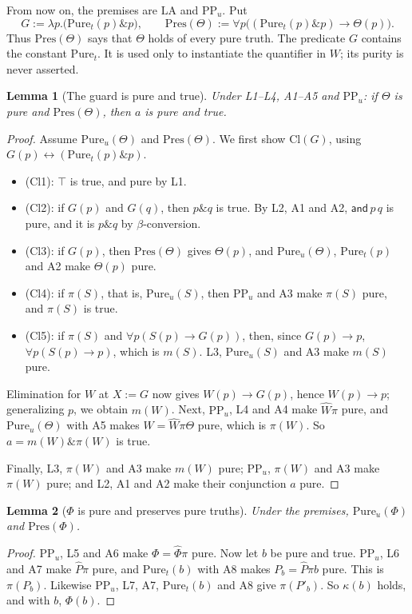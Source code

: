 \documentclass[12pt,leqno]{article}
\newcommand{\AND}{\ensuremath{\mathbin{\&}}}
\newcommand{\IFF}{\ensuremath{\leftrightarrow}}
\newcommand{\IC}{\ensuremath{\rightarrow}}
\newcommand{\Pure}{\ensuremath{\mathrm{Pure}}}
\newcommand{\Cl}{\ensuremath{\mathrm{Cl}}}
\newcommand{\Pres}{\ensuremath{\mathrm{Pres}}}
\newcommand{\PPu}{\ensuremath{\mathrm{PP}_u}}
\newcommand{\hW}{\ensuremath{\widehat{W}}}
\newcommand{\hP}{\ensuremath{\widehat{P}}}
\newcommand{\hPhi}{\ensuremath{\widehat{\Phi}}}
\newcommand{\conj}{\ensuremath{\mathsf{and}}}
\theoremstyle{plain}
\newtheorem{lemma}{Lemma}
\begin{document}
From now on, the premises are \(\mathrm{LA}\) and \(\PPu\). Put
\[
 G:=\lambda p.\bigl(\Pure_t(p)\AND p\bigr),\qquad
 \Pres(\Theta):=\forall p\bigl((\Pure_t(p)\AND p)\IC\Theta(p)\bigr).
\]
Thus \(\Pres(\Theta)\) says that \(\Theta\) holds of every pure truth.
The predicate \(G\) contains the constant \(\Pure_t\). It is used only to
instantiate the quantifier in \(W\); its purity is never asserted.

\begin{lemma}[The guard is pure and true]\label{lem:closure-true}
Under L1--L4, A1--A5 and \(\PPu\): if \(\Theta\) is pure and
\(\Pres(\Theta)\), then \(a\) is pure and true.
\end{lemma}
\begin{proof}
Assume \(\Pure_u(\Theta)\) and \(\Pres(\Theta)\). We first show
\(\Cl(G)\), using \(G(p)\IFF(\Pure_t(p)\AND p)\).
\begin{itemize}
\item (Cl1): \(\top\) is true, and pure by L1.
\item (Cl2): if \(G(p)\) and \(G(q)\), then \(p\AND q\) is true. By L2,
  A1 and A2, \(\conj\,p\,q\) is pure, and it is \(p\AND q\) by
  \(\beta\)-conversion.
\item (Cl3): if \(G(p)\), then \(\Pres(\Theta)\) gives \(\Theta(p)\), and
  \(\Pure_u(\Theta)\), \(\Pure_t(p)\) and A2 make \(\Theta(p)\) pure.
\item (Cl4): if \(\pi(S)\), that is, \(\Pure_u(S)\), then \(\PPu\) and A3
  make \(\pi(S)\) pure, and \(\pi(S)\) is true.
\item (Cl5): if \(\pi(S)\) and \(\forall p(S(p)\IC G(p))\), then, since
  \(G(p)\IC p\), \(\forall p(S(p)\IC p)\), which is \(m(S)\). L3,
  \(\Pure_u(S)\) and A3 make \(m(S)\) pure.
\end{itemize}
Elimination for \(W\) at \(X:=G\) now gives \(W(p)\IC G(p)\), hence
\(W(p)\IC p\); generalizing \(p\), we obtain \(m(W)\). Next, \(\PPu\),
L4 and A4 make \(\hW\pi\) pure, and \(\Pure_u(\Theta)\) with A5 makes
\(W=\hW\pi\Theta\) pure, which is \(\pi(W)\). So
\(a=m(W)\AND\pi(W)\) is true.

Finally, L3, \(\pi(W)\) and A3 make \(m(W)\) pure; \(\PPu\), \(\pi(W)\)
and A3 make \(\pi(W)\) pure; and L2, A1 and A2 make their conjunction
\(a\) pure.
\end{proof}

\begin{lemma}[\(\Phi\) is pure and preserves pure truths]\label{lem:Phi}
Under the premises, \(\Pure_u(\Phi)\) and \(\Pres(\Phi)\).
\end{lemma}
\begin{proof}
\(\PPu\), L5 and A6 make \(\Phi=\hPhi\pi\) pure. Now let \(b\) be pure
and true. \(\PPu\), L6 and A7 make \(\hP\pi\) pure, and \(\Pure_t(b)\)
with A8 makes \(P_b=\hP\pi b\) pure. This is \(\pi(P_b)\). Likewise \(\PPu\), L7, A7, \(\Pure_t(b)\) and
A8 give \(\pi(P'_b)\). So \(\kappa(b)\) holds, and with \(b\),
\(\Phi(b)\).
\end{proof}
\end{document}
